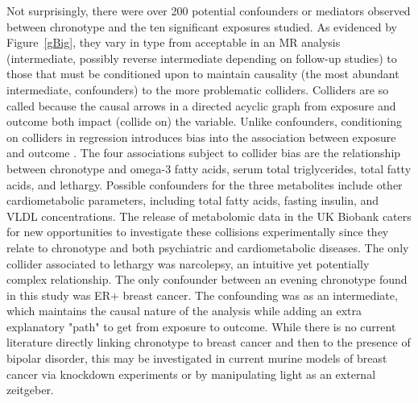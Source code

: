 \documentclass[journal,article,submit,moreauthors,pdftex]{Definitions/mdpi}
\begin{document}
Not surprisingly, there were over 200 potential confounders or mediators observed between chronotype and the ten significant exposures studied. As evidenced by Figure~\ref{gBig}, they vary in type from acceptable in an MR analysis (intermediate, possibly reverse intermediate depending on follow-up studies) to those that must be conditioned upon to maintain causality (the most abundant intermediate, confounders) to the more problematic colliders. Colliders are so called because the causal arrows in a directed acyclic graph from exposure and outcome both impact (collide on) the variable. Unlike confounders, conditioning on colliders in regression introduces bias into the association between exposure and outcome \cite{Rohrer}. The four associations subject to collider bias are the relationship between chronotype and omega-3 fatty acids, serum total triglycerides, total fatty acids, and lethargy. Possible confounders for the three metabolites include other cardiometabolic parameters, including total fatty acids, fasting insulin, and VLDL concentrations. The release of metabolomic data in the UK Biobank \cite{biobank} caters for new opportunities to investigate these collisions experimentally since they relate to chronotype and both psychiatric and cardiometabolic diseases. The only collider associated to lethargy was narcolepsy, an intuitive yet potentially complex relationship. The only confounder between an evening chronotype found in this study was ER+ breast cancer. The confounding was as an intermediate, which maintains the causal nature of the analysis while adding an extra explanatory "path" to get from exposure to outcome. While there is no current literature directly linking chronotype to breast cancer and then to the presence of bipolar disorder, this may be investigated in current murine models of breast cancer via knockdown experiments or by manipulating light as an external zeitgeber.
\end{document}

